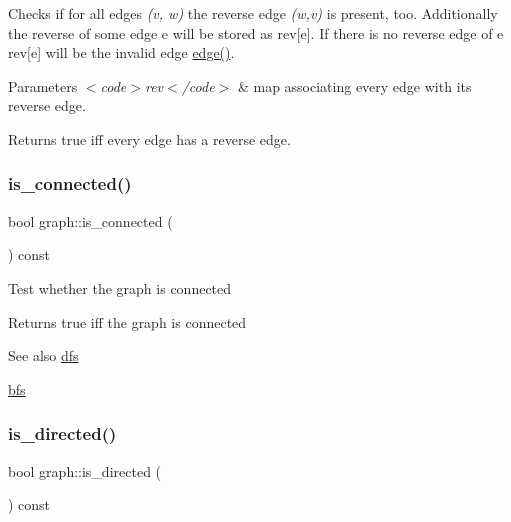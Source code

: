 Checks if for all edges {\itshape (v, w)} the reverse edge {\itshape (w,v)} is present, too. Additionally the reverse of some edge {\ttfamily e} will be stored as {\ttfamily rev\mbox{[}e\mbox{]}}. If there is no reverse edge of {\ttfamily e} {\ttfamily rev\mbox{[}e\mbox{]}} will be the invalid edge {\ttfamily \mbox{\hyperlink{classedge}{edge()}}}.


\begin{DoxyParams}{Parameters}
{\em $<$code$>$rev$<$/code$>$} & map associating every edge with its reverse edge. \\
\hline
\end{DoxyParams}
\begin{DoxyReturn}{Returns}
true iff every edge has a reverse edge. 
\end{DoxyReturn}
\mbox{\label{classgraph_a599e2bf967df8a2052a9892c94db98b7}} 
\subsubsection{\texorpdfstring{is\+\_\+connected()}{is\_connected()}}
{\footnotesize\ttfamily bool graph\+::is\+\_\+connected (\begin{DoxyParamCaption}{ }\end{DoxyParamCaption}) const}

Test whether the graph is connected

\begin{DoxyReturn}{Returns}
true iff the graph is connected 
\end{DoxyReturn}
\begin{DoxySeeAlso}{See also}
\mbox{\hyperlink{classdfs}{dfs}} 

\mbox{\hyperlink{classbfs}{bfs}} 
\end{DoxySeeAlso}
\mbox{\label{classgraph_afc510be7479fa903fde9e0e615470ab0}} 
\subsubsection{\texorpdfstring{is\+\_\+directed()}{is\_directed()}}
{\footnotesize\ttfamily bool graph\+::is\+\_\+directed (\begin{DoxyParamCaption}{ }\end{DoxyParamCaption}) const}

